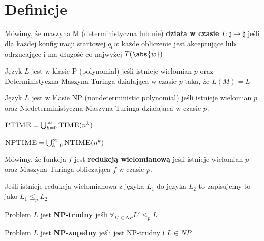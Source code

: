 \section{Definicje}

\begin{definition}
    Mówimy, że maszyna M (deterministyczna lub nie) \textbf{działa w czasie} \( T : \natural \rightarrow \natural \) jeśli dla każdej konfiguracji startowej \( q_0 w \) każde obliczenie jest akceptujące lub odrzucające i ma długość co najwyżej \( T(\abs{w}) \)
\end{definition}

\begin{definition}
    Język \( L \) jest w klasie P (polynomial) jeśli istnieje wielomian \( p \)
    oraz Deterministyczna Maszyna Turinga działająca w czasie \( p \) taka, że \( L(M) = L \)
\end{definition}

\begin{definition}
    Język \( L \) jest w klasie NP (nondeterministic polynomial) jeśli istnieje wielomian \( p \) oraz Niedeterministyczna Maszyna Turinga działająca w czasie \( p \).
\end{definition}

\begin{definition}
    \( \textsc{PTIME} = \bigcup_{k=0}^\infty \textsc{TIME}(n^k) \)
\end{definition}

\begin{definition}
    \( \textsc{NPTIME} = \bigcup_{k=0}^\infty \textsc{NTIME}(n^k) \)
\end{definition}


\begin{definition}
    Mówimy, że funkcja \( f \) jest \textbf{redukcją wielomianową} jeśli istnieje wielomian \( p \) oraz Maszyna Turinga obliczająca \( f \) w czasie \( p \). 
    
    Jeśli istnieje redukcja wielomianowa z języka \( L_1 \) do języka \( L_2 \) to zapisujemy to jako \( L_1 \leq_p L_2 \)
\end{definition}

\begin{definition}
    Problem \( L \) jest \textbf{NP-trudny} jeśli \( \forall_{L' \in NP} L' \leq_p L \)
\end{definition}
\begin{definition}
    Problem \( L \) jest \textbf{NP-zupełny} jeśli jest NP-trudny i \( L \in NP \)
\end{definition}

